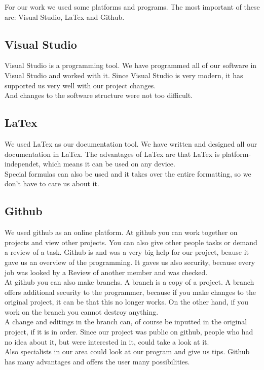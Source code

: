 For our work we used some platforms and programs. The most important of these are: Visual Studio, LaTex and Github.\\

\subsection {Visual Studio}

Visual Studio is a programming tool. We have programmed all of our software in Visual Studio and worked with it. Since Visual Studio is very modern, it has supported us very well with our project changes.\\
 And changes to the software structure were not too difficult.

\subsection {LaTex}

We used LaTex as our documentation tool. We have written and designed all our documentation in LaTex. The advantages of LaTex are that LaTex is platform-independet, which means it can be used on any device.\\
 Special formulas can also be used and it takes over the entire formatting, so we don’t have to care us about it.

\subsection {Github}

We used github as an online platform. At github you can work together on projects and view other projects. You can also give other people tasks or demand a review of a task. Github is and was a very big help for our project, beause it gave us an overview of the programming. It gaves us also security, because every job was looked by a Review of another member and was checked. \\
At github you can also make branchs. A branch is a copy of a project. A branch offers additional security to the programmer, because if you make changes to the original project, it can be that this no longer works. On the other hand, if you work on the branch you cannot destroy anything. \\
A change and editings in the branch can, of course be inputted in the original project, if it is in order. Since our project was public on github, people who had no idea about it, but were interested in it, could take a look at it. \\
Also specialists in our area could look at our program and give us tips. Github has many advantages and offers the user many possibilities.
